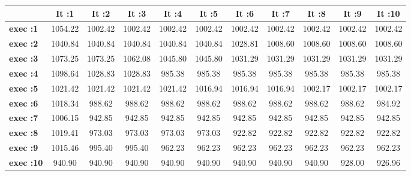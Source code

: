 \begin{tiny}\begin{tabular}{|l|c|c|c|c|c|c|c|c|c|c|}
\hline
&\textbf{It :1}&\textbf{It :2}&\textbf{It :3}&\textbf{It :4}&\textbf{It :5}&\textbf{It :6}&\textbf{It :7}&\textbf{It :8}&\textbf{It :9}&\textbf{It :10}\\\hline
\textbf{exec :1}&1054.22&1002.42&1002.42&1002.42&1002.42&1002.42&1002.42&1002.42&1002.42&1002.42\\\hline
\textbf{exec :2}&1040.84&1040.84&1040.84&1040.84&1040.84&1028.81&1008.60&1008.60&1008.60&1008.60\\\hline
\textbf{exec :3}&1073.25&1073.25&1062.08&1045.80&1045.80&1031.29&1031.29&1031.29&1031.29&1031.29\\\hline
\textbf{exec :4}&1098.64&1028.83&1028.83&985.38&985.38&985.38&985.38&985.38&985.38&985.38\\\hline
\textbf{exec :5}&1021.42&1021.42&1021.42&1021.42&1016.94&1016.94&1016.94&1002.17&1002.17&1002.17\\\hline
\textbf{exec :6}&1018.34&988.62&988.62&988.62&988.62&988.62&988.62&988.62&988.62&984.92\\\hline
\textbf{exec :7}&1006.15&942.85&942.85&942.85&942.85&942.85&942.85&942.85&942.85&942.85\\\hline
\textbf{exec :8}&1019.41&973.03&973.03&973.03&973.03&922.82&922.82&922.82&922.82&922.82\\\hline
\textbf{exec :9}&1015.46&995.40&995.40&962.23&962.23&962.23&962.23&962.23&962.23&962.23\\\hline
\textbf{exec :10}&940.90&940.90&940.90&940.90&940.90&940.90&940.90&940.90&928.00&926.96\\\hline
\end{tabular}
\end{tiny}